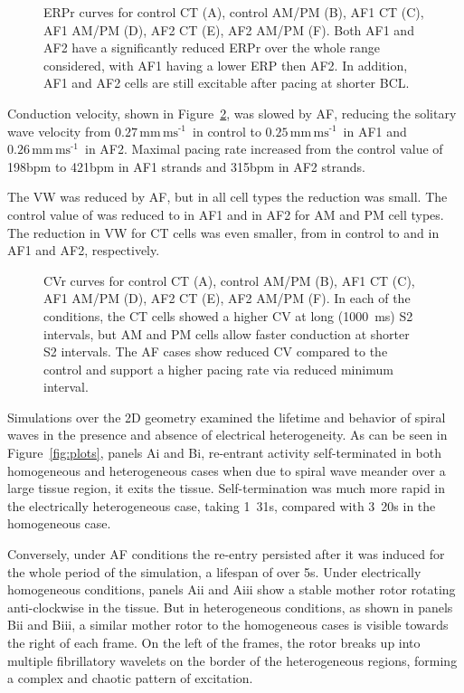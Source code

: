 \begin{figure}[tb]
\centering
\caption{ERPr curves for control CT (A), control AM/PM (B), AF1 CT (C),
AF1 AM/PM (D), AF2 CT (E), AF2 AM/PM (F).  Both AF1 and AF2 have a
significantly reduced ERPr over the whole range considered, with AF1
having a lower ERP then AF2.  In addition, AF1 and AF2 cells are still
excitable after pacing at  shorter BCL.}
\label{fig:erpr}
\end{figure}

Conduction velocity, shown in Figure~\ref{fig:cvr}, was slowed by AF,
reducing the solitary wave velocity from $0.27\,\text{mm}\,\text{ms}^{\text{-1}}$\ in
control to $0.25\,\text{mm}\,\text{ms}^{\text{-1}}$\ in AF1 and
$0.26\,\text{mm}\,\text{ms}^{\text{-1}}$\ in
AF2.  Maximal pacing rate increased from the control value of \unit{198}{bpm} to
\unit{421}{bpm} in AF1 strands and \unit{315}{bpm} in AF2 strands.

The VW was reduced by AF, but in all cell types the reduction was small.
The control value of  was reduced to  in AF1 and 
in AF2 for AM and PM cell types.  The reduction in VW for CT cells was
even smaller, from  in control to  and  in AF1 and
AF2, respectively.

\begin{figure}[tb]
\centering
\caption{CVr curves for control CT (A), control AM/PM (B), AF1 CT (C),
AF1 AM/PM (D), AF2 CT (E), AF2 AM/PM (F).  In each of the conditions,
the CT cells showed a higher CV at long (1000~ms) S2 intervals, but AM
and PM cells allow faster conduction at shorter S2 intervals.  The AF
cases show reduced CV compared to the control and support a higher
pacing rate via reduced minimum interval.}
\label{fig:cvr}
\end{figure}

Simulations over the 2D geometry examined the lifetime and behavior of
spiral waves in the presence and absence of electrical heterogeneity.
As can be seen in Figure~\ref{fig:plots}, panels Ai and Bi, re-entrant
activity self-terminated in both homogeneous and heterogeneous cases
when due to spiral wave meander over a large tissue region, it
exits the tissue.  Self-termination was much more rapid in the
electrically heterogeneous case, taking \unit{1.31}{s}, compared with
\unit{3.20}{s} in
the homogeneous case.

Conversely, under AF conditions the re-entry persisted after it was
induced for the whole period of the simulation, a lifespan of over \unit{5}{s}.
Under electrically homogeneous conditions, panels Aii and Aiii show a
stable mother rotor rotating anti-clockwise in the tissue.  But in
heterogeneous conditions, as shown in panels Bii and Biii, a similar
mother rotor to the homogeneous cases is visible towards the right of
each frame.  On the left of the frames, the rotor breaks up into
multiple fibrillatory wavelets on the border of the heterogeneous
regions, forming a complex and chaotic pattern of excitation.

